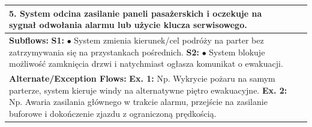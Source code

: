 \documentclass[12pt,a4paper]{article}
\begin{document}
\begin{table}[h!]
\begin{tabular}{|p{}|p{}|p{}|}
{5. System odcina zasilanie paneli pasażerskich i oczekuje na sygnał odwołania alarmu lub użycie klucza serwisowego.} \\ \hline
\multicolumn{3}{|p{0.9\textwidth}|}{\textbf{Subflows:} \newline
\textbf{S1:} \newline
\hspace*{10pt} $\bullet$ System zmienia kierunek/cel podróży na parter bez zatrzymywania się na przystankach pośrednich. \newline
\textbf{S2:} \newline
\hspace*{10pt} $\bullet$ System blokuje możliwość zamknięcia drzwi i natychmiast ogłasza komunikat o ewakuacji.} \\ \hline
\multicolumn{3}{|p{0.9\textwidth}|}{\textbf{Alternate/Exception Flows:} \newline
\textbf{Ex. 1:} Np. Wykrycie pożaru na samym parterze, system kieruje windy na alternatywne piętro ewakuacyjne. \newline
\textbf{Ex. 2:} Np. Awaria zasilania głównego w trakcie alarmu, przejście na zasilanie buforowe i dokończenie zjazdu z ograniczoną prędkością.} \\ \hline
\end{tabular}
\end{table}
\end{document}
